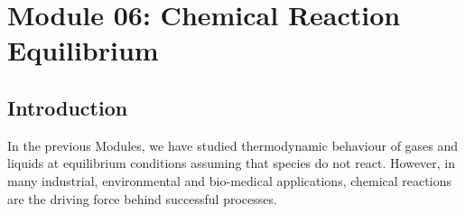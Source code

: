 \documentclass[12pts,a4paper,amsmath,amssymb,floatfix]{article}%
\newcounter{reaction}
\begin{document}
\clearpage

\section{Module 06: Chemical Reaction Equilibrium}\label{Section:06}

\subsection{Introduction}\label{Section:06:Introduction}
In the previous Modules, we have studied thermodynamic behaviour of gases and liquids at equilibrium conditions assuming that species do not react. However, in many industrial, environmental and bio-medical applications, chemical reactions are the driving force behind successful processes. 
\end{document}
